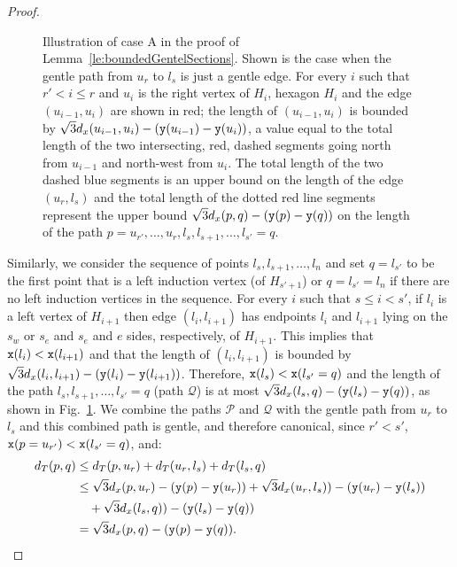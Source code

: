 \begin{proof}
\begin{figure}[!b]
\center{\caseA}
\caption{Illustration of case A in the proof of Lemma~\ref{le:boundedGentelSections}.
Shown is the case when the gentle path from $u_r$ to $l_s$ is just a gentle
edge. For every $i$ such that $r' < i \leq r$ and $u_i$ is
the right vertex of $H_i$, hexagon $H_i$ and the edge $(u_{i-1},u_i)$ are shown
in red; the length of $(u_{i-1},u_i)$ is bounded by
$\sqrt{3}d_x(u_{i-1},u_i) - ({\tt y}(u_{i-1})-{\tt y}(u_i))$, a value equal
to the total length of the two intersecting, red, dashed segments going north
from $u_{i-1}$ and north-west from $u_i$. The total length of the two dashed
blue segments is an upper bound on the length of the edge $(u_r,l_s)$ and
the total length of the dotted red line segments represent the upper bound
$\sqrt{3}d_x(p,q) - ({\tt y}(p)-{\tt y}(q))$ on the length of the path 
$p=u_{r'}, \dots, u_r, l_{s}, l_{s+1}, \dots, l_{s'}=q$.}
\label{fig:caseA}
\end{figure}

Similarly, we consider the sequence of points $l_s, l_{s+1}, \dots, l_n$ and
set $q=l_{s'}$ to be the first point that is a left induction vertex (of $H_{s'+1}$)
or $q = l_{s'} = l_n$ if there are no left induction vertices in the sequence.
For every $i$ such that $s \leq i < s'$, if $l_i$ is a left vertex of $H_{i+1}$
then edge $(l_{i},l_{i+1})$ has endpoints $l_{i}$ and $l_{i+1}$ lying on the 
$s_w$ or $s_e$ and $s_e$ and $e$ sides, respectively, of $H_{i+1}$. This implies
that ${\tt x}(l_{i}) < {\tt x}(l_{i+1})$ and that the length of
$(l_{i},l_{i+1})$ is bounded by 
$\sqrt{3}d_x(l_{i},l_{i+1}) - ({\tt y}(l_{i})-{\tt y}(l_{i+1}))$. Therefore, 
${\tt x}(l_s) < {\tt x}(l_{s'}=q)$ and the length of the path 
$l_{s}, l_{s+1}, \dots, l_{s'}=q$ (path $\mathcal{Q}$) is at most
$\sqrt{3}d_x(l_{s},q)-({\tt y}(l_s)-{\tt y}(q))$, as shown in 
Fig.~\ref{fig:caseA}. 
We combine the paths $\mathcal{P}$ and $\mathcal{Q}$ with the gentle path from
$u_r$ to $l_s$ and this combined
path is gentle, and therefore canonical, since $r' < s'$,  
${\tt x}(p=u_{r'}) < {\tt x}(l_{s'}=q)$, and:
\begin{align*}
d_T (p, q) & \leq d_T(p, u_r) + d_T(u_r, l_s) + d_T(l_s, q) \\
& \leq \sqrt{3}d_x(p,u_r)-({\tt y}(p)-{\tt y}(u_r))+ \sqrt{3}d_x(u_r,l_s))-({\tt y}(u_r)-{\tt y}(l_s)) \\
 & \quad + \sqrt{3}d_x(l_s, q)) - ({\tt y}(l_s) - {\tt y}(q)) \\
& = \sqrt{3}d_x(p,q)-({\tt y}(p)-{\tt y}(q)).
\end{align*}


\end{proof}
